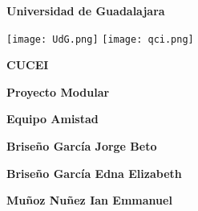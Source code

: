 \begin{titlepage}
    \centering
    {\bfseries\LARGE Universidad de Guadalajara \par}
    \vfill
    {
        \texttt{[image: UdG.png]}
        \texttt{[image: qci.png]}
        \par
    }
    \vfill
    {\bfseries\LARGE CUCEI \par}
    \vfill
    {\bfseries\LARGE Proyecto Modular \par}
    \vfill
    {\bfseries\LARGE Equipo Amistad \par}
    \vfill
    {\bfseries\LARGE Briseño García Jorge Beto \par}
    \vfill
    {\bfseries\LARGE Briseño García Edna Elizabeth \par}
    \vfill
    {\bfseries\LARGE Muñoz Nuñez Ian Emmanuel \par}
\end{titlepage}
